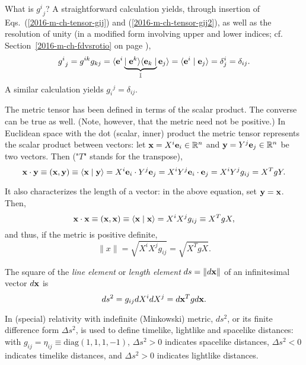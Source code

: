 What is  ${g^i}_{j}$?
A straightforward calculation yields, through insertion of Eqs.~(\ref{2016-m-ch-tensor-gij}) and (\ref{2016-m-ch-tensor-gij2}),
as well as the resolution of unity (in a modified form involving upper and lower indices;
cf. Section~\ref{2016-m-ch-fdvsrotio} on page \pageref{2016-m-ch-fdvsrotio}),
\begin{equation}
{g^i}_{j} = g^{ik}g_{kj}  =
\langle {\bf e}^i \underbrace{\mid {\bf e}^k \rangle \langle {\bf e}_k \mid}_{{\Bbb I}} {\bf e}_j\rangle
= \langle {\bf e}^i \mid {\bf e}_j\rangle
= \delta^i_j = \delta_{ij}.
\label{2014-m-ch-tensor-deltag}
\end{equation}
A similar calculation yields ${g_i}^{j} = \delta_{ij}$.




The metric tensor has been defined in terms of the scalar product.
The converse can be true as well.
(Note, however, that the metric need not be positive.)
In Euclidean space with the dot (scalar, inner) product
the metric tensor represents the scalar product between vectors: let
${\bf x}=X^i{\bf e}_i \in {\Bbb R}^n$ and ${\bf y}=Y^j{\bf e}_j \in {\Bbb R}^n$ be two vectors.
Then ("$T$" stands for the transpose),
\begin{equation}
{\bf x}\cdot {\bf y}\equiv ({\bf x},{\bf y})\equiv \langle {\bf x}\mid {\bf y}\rangle
= X^i {\bf e}_i\cdot Y^j {\bf e}_j
= X^iY^j {\bf e}_i\cdot  {\bf e}_j
=X^iY^j g_{ij}= X^T g Y.
\end{equation}

It also characterizes the length of a vector: in the above
equation, set ${\bf y}={\bf x}$. Then,
\begin{equation}
{\bf x}\cdot {\bf x}\equiv ({\bf x},{\bf x})\equiv \langle {\bf x}\mid {\bf x}\rangle
=X^iX^j g_{ij}\equiv X^T g X,
\end{equation}
and thus, if the metric is positive definite,
\begin{equation}
\|  x\|  =\sqrt{X^iX^j g_{ij}}= \sqrt{X^T g X}.
\end{equation}



The square of the {\em line element} or {\em length element}
$ds =\| d{\bf x} \| $ of an infinitesimal vector $d{\bf x} $ is
\begin{equation}
d s^2  = g_{ij}dX^i dX^j= d{\bf x}^T g d{\bf x}.
\end{equation}

In (special) relativity with indefinite (Minkowski) metric, $ds^2$, or its finite difference form $\Delta s^2$, is used to define timelike, lightlike and spacelike distances:
with $g_{ij}=\eta_{ij}\equiv \text{diag}(1,1,1,-1)$,
$\Delta s^2 >0$ indicates spacelike distances,
$\Delta s^2 <0$ indicates timelike distances,
and $\Delta s^2 >0$ indicates lightlike distances.




